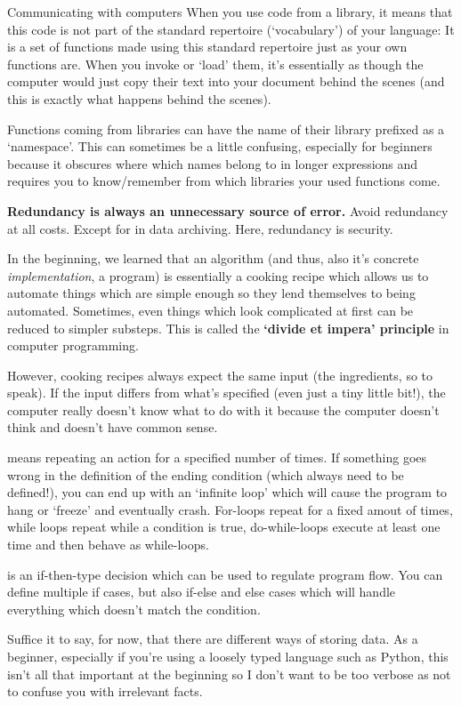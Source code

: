 \documentclass[10pt]{beamer}
\begin{document}
\begin{frame}[allowframebreaks]{Communicating with computers}
When you use code from a library, it means that this code is not part of the standard repertoire (`vocabulary') of your language: It is a set of functions made using this standard repertoire just as your own functions are. When you invoke or `load' them, it's essentially as though the computer would just copy their text into your document behind the scenes (and this is exactly what happens behind the scenes). 

Functions coming from libraries can have the name of their library prefixed as a `namespace'. This can sometimes be a little confusing, especially for beginners because it obscures where which names belong to in longer expressions and requires you to know/remember from which libraries your used functions come.

\textbf{Redundancy is always an unnecessary source of error.} Avoid redundancy at all costs. Except for in data archiving. Here, redundancy is security.

In the beginning, we learned that an algorithm (and thus, also it's concrete \emph{implementation}, a program) is essentially a cooking recipe which allows us to automate things which are simple enough so they lend themselves to being automated. Sometimes, even things which look complicated at first can be reduced to simpler substeps. This is called the \textbf{`divide et impera' principle} in computer programming. 

However, cooking recipes always expect the same input (the ingredients, so to speak). If the input differs from what's specified (even just a tiny little bit!), the computer really doesn't know what to do with it because the computer doesn't think and doesn't have common sense. 

 means repeating an action for a specified number of times. If something goes wrong in the definition of the ending condition (which always need to be defined!), you can end up with an `infinite loop' which will cause the program to hang or `freeze' and eventually crash. For-loops repeat for a fixed amout of times, while loops repeat while a condition is true, do-while-loops execute at least one time and then behave as while-loops.

 is an if-then-type decision which can be used to regulate program flow. You can define multiple if cases, but also if-else and else cases which will handle everything which doesn't match the condition.

Suffice it to say, for now, that there are different ways of storing data. As a beginner, especially if you're using a loosely typed language such as Python, this isn't all that important at the beginning so I don't want to be too verbose as not to confuse you with irrelevant facts.


\end{frame}
\end{document}
